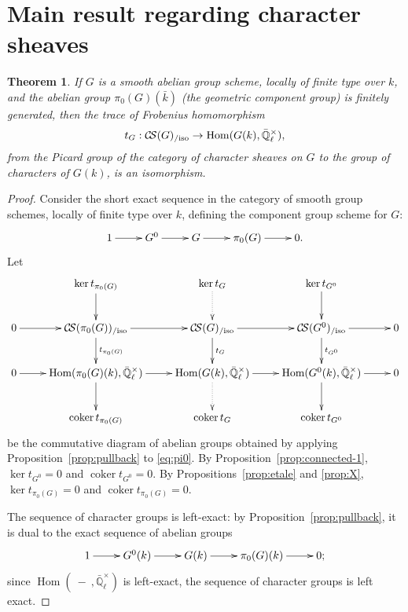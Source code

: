 \documentclass[11pt]{amsart}
\theoremstyle{plain}
\newtheorem{theorem}{Theorem}[section]
\theoremstyle{definition}
\theoremstyle{remark}
\newcommand{\EE}{\mathbb{\bar Q}_\ell}
\newcommand{\bFq}{\bar{k}}
\newcommand{\Fq}{k}
\DeclareMathOperator{\Hom}{Hom}
\DeclareMathOperator{\coker}{coker}
\newcommand{\CS}{{\mathcal{C\hskip-1.8pt S}}}
\begin{document}
\section{Main result regarding character sheaves}

%
\begin{theorem}\label{thm:snake}
  If $G$ is a smooth abelian group scheme, locally of finite type over
  $\Fq$, and the abelian group $\pi_0(G)(\bFq)$ (the geometric
  component group) is finitely generated, then the trace of Frobenius
  homomorphism
  \[
  t_{G} : \CS(G)_{/\text{iso}} \to \Hom(G(\Fq),\EE^\times),
  \]
  from the Picard group of the category of character sheaves on $G$ to
  the group of characters of $G(\Fq)$, is an isomorphism.
\end{theorem}

\begin{proof}
  Consider the short exact sequence in the category of smooth group
  schemes, locally of finite type over $\Fq$, defining the component
  group scheme for $G$:
  \begin{equation}\label{eq:pi0}
    \xymatrix{
      1 \ar[r] & G^0 \ar[r] & G \ar[r] & \pi_0(G) \ar[r] & 0.
      }
  \end{equation}
  Let
  \[
  \xymatrix{
    & \ar[d] \ker t_{\pi_0(G)} & \ar@{.>}[d] \ker t_{G} & \ar[d] \ker t_{G^0} & \\
    0\ar[r] & \ar[d]^{t_{\pi_0(G)}} \CS(\pi_0(G))_{/\text{iso}} \ar[r]
    & \ar[d]^{t_{G}} \CS(G)_{/\text{iso}} \ar[r] & \ar[d]^{t_{G^0}} \CS(G^0)_{/\text{iso}} \ar[r] & 0\\
    0 \ar[r] & \ar[d] \Hom(\pi_0(G)(\Fq),\EE^\times) \ar[r]
    & \ar@{.>}[d] \Hom(G(\Fq),\EE^\times) \ar[r] & \ar[d] \Hom(G^0(\Fq),\EE^\times) \ar[r] & 0\\
    & \coker t_{\pi_0(G)} & \coker t_{G} &  \coker t_{G^0} & \\
    }
  \]
  be the commutative diagram of abelian groups obtained by applying
  Proposition~\ref{prop:pullback} to \eqref{eq:pi0}.  By
  Proposition~\ref{prop:connected-1}, $\ker t_{G^0} =0$ and $\coker t_{G^0}=0$.
  By Propositions~\ref{prop:etale} and \ref{prop:X}, $\ker t_{\pi_0(G)}=0$
  and $\coker t_{\pi_0(G)}=0$.

  The sequence of character groups is left-exact: by
  Proposition~\ref{prop:pullback}, it is dual to the exact sequence of
  abelian groups
  \begin{equation}\label{eq:pi0}
    \xymatrix{
      1 \ar[r] & G^0(\Fq) \ar[r] & G(\Fq) \ar[r] & \pi_0(G)(\Fq) \ar[r] & 0;
    }
  \end{equation}
  since $\Hom(\ - \ ,\EE^\times)$ is left-exact, the sequence of
  character groups is left exact.


\end{proof}
\end{document}
